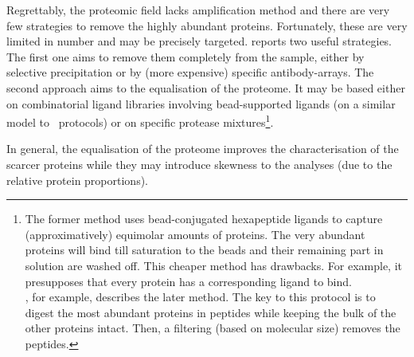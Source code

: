 Regrettably, the proteomic field lacks amplification method and
there are very few strategies to remove the highly abundant proteins. Fortunately,
these are very limited in number and may be precisely targeted.
\cite{Zhang2014} reports two useful strategies. The first one aims to remove
them completely from the sample, either by selective
precipitation or by (more expensive) specific antibody-arrays.
The second approach aims to the equalisation of the proteome.
It may be based either on combinatorial ligand libraries involving
bead-supported ligands (on a similar model to \Rnaseq\ protocols)
or on specific protease mixtures\footnote{The former method uses bead-conjugated
hexapeptide ligands to capture (approximatively) equimolar amounts of proteins.
The very abundant proteins will bind till saturation to the beads and their
remaining part in solution are washed off. This cheaper method has drawbacks.
For example, it presupposes that every protein has a corresponding ligand to bind.
\\\cite{MichaelMentenDepletion}, for example, describes the later method. The
key to this protocol is to digest the most abundant proteins in peptides while
keeping the bulk of the other proteins intact. Then, a filtering (based on
molecular size) removes the peptides.}.

In general, the equalisation of the proteome improves the characterisation
of the scarcer proteins  while they may introduce skewness
to the analyses (due to the relative protein proportions).

